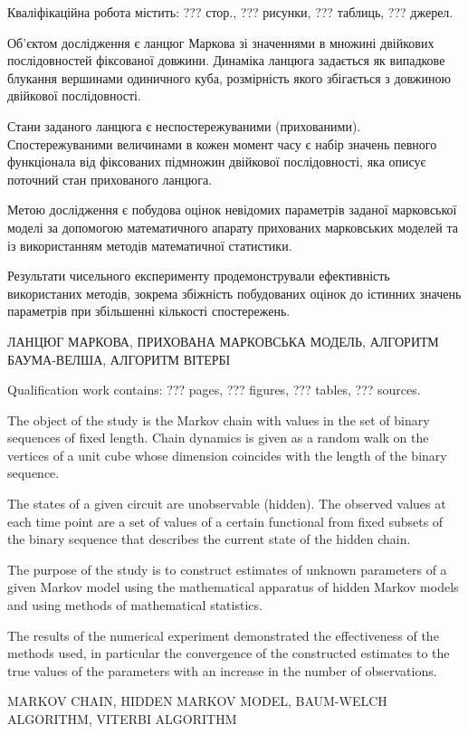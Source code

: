 
\abstractUkr

Кваліфікаційна робота містить: ??? стор., ??? рисунки, ??? таблиць, ??? джерел.

Об'єктом дослідження є ланцюг Маркова зі значеннями в множині двійкових послідовностей фіксованої довжини. Динаміка ланцюга задається як випадкове блукання вершинами одиничного куба, розмірність якого збігається з довжиною двійкової послідовності. 

Стани заданого ланцюга є неспостережуваними (прихованими). Спостережуваними величинами в кожен момент часу є набір значень певного функціонала від фіксованих підмножин двійкової послідовності, яка описує поточний стан прихованого ланцюга.

Метою дослідження є побудова оцінок невідомих параметрів заданої марковської моделі за допомогою математичного апарату прихованих марковських моделей та із використанням методів математичної статистики. 

Результати чисельного експерименту продемонстрували ефективність використаних методів, зокрема збіжність побудованих оцінок до істинних значень параметрів при збільшенні кількості спостережень.

\MakeUppercase{ЛАНЦЮГ МАРКОВА, ПРИХОВАНА МАРКОВСЬКА МОДЕЛЬ, АЛГОРИТМ БАУМА-ВЕЛША, АЛГОРИТМ ВІТЕРБІ}

\abstractEng

Qualification work contains: ??? pages, ??? figures, ??? tables, ??? sources.

The object of the study is the Markov chain with values   in the set of binary sequences of fixed length. Chain dynamics is given as a random walk on the vertices of a unit cube whose dimension coincides with the length of the binary sequence.

The states of a given circuit are unobservable (hidden). The observed values at each time point are a set of values of a certain functional from fixed subsets of the binary sequence that describes the current state of the hidden chain.

The purpose of the study is to construct estimates of unknown parameters of a given Markov model using the mathematical apparatus of hidden Markov models and using methods of mathematical statistics.

The results of the numerical experiment demonstrated the effectiveness of the methods used, in particular the convergence of the constructed estimates to the true values of the parameters with an increase in the number of observations.

\MakeUppercase{MARKOV CHAIN, HIDDEN MARKOV MODEL, BAUM-WELCH ALGORITHM, VITERBI ALGORITHM}

\clearpage